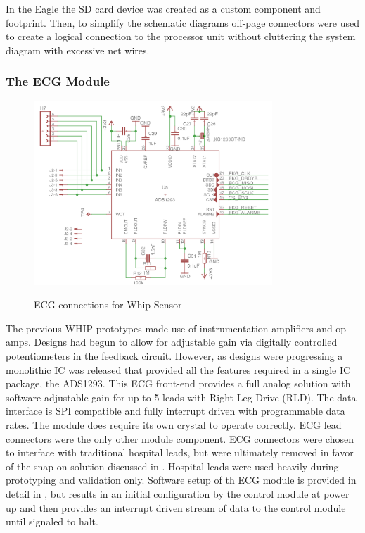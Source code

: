 In the Eagle the SD card device was created as a custom component and footprint. Then, to simplify the schematic diagrams off-page connectors were used to create a logical connection to the processor unit without cluttering the system diagram with excessive net wires.

\subsubsection{The ECG Module}
\begin{figure}
	\begin{center}
		\label{fig:Rev5_ECG}
		\includegraphics[scale=1,width=0.8\textwidth]{Images/Rev5_ECG.png} 
		\caption{ECG connections for Whip Sensor}
	\end{center}
\end{figure}

The previous WHIP prototypes made use of instrumentation amplifiers and op amps. Designs had begun to allow for adjustable gain via digitally controlled potentiometers in the feedback circuit. However, as designs were progressing a monolithic IC was released that provided all the features required in a single IC package, the ADS1293.\cite{ADS1293} This ECG front-end provides a full analog solution with software adjustable gain for up to 5 leads with Right Leg Drive (RLD). The data interface is SPI compatible and fully interrupt driven with programmable data rates. The module does require its own crystal to operate correctly. ECG lead connectors were the only other module component. ECG connectors were chosen to interface with traditional hospital leads, but were ultimately removed in favor of the snap on solution discussed in . Hospital leads were used heavily during prototyping and validation only. Software setup of th ECG module is provided in detail in , but results in an initial configuration by the control module at power up and then provides an interrupt driven stream of data to the control module until signaled to halt.

